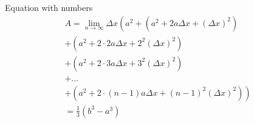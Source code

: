\documentclass{libs/XJTLU_format}
\begin{document}
\begin{frame}
    \begin{block}{Equation with numbers}
        \begin{multline}
            A=\lim_{n\rightarrow\infty}\Delta x\left(a^{2}+\left(a^{2}+2a\Delta x+\left(\Delta x\right)^{2}\right)\right.\label{eq:reset}\\
            +\left(a^{2}+2\cdot2a\Delta x+2^{2}\left(\Delta x\right)^{2}\right)\\
            +\left(a^{2}+2\cdot3a\Delta x+3^{2}\left(\Delta x\right)^{2}\right)\\
            +\ldots\\
            \left.+\left(a^{2}+2\cdot(n-1)a\Delta x+(n-1)^{2}\left(\Delta x\right)^{2}\right)\right)\\
            =\frac{1}{3}\left(b^{3}-a^{3}\right)
        \end{multline}
    \end{block}
\end{frame}


\end{document}
